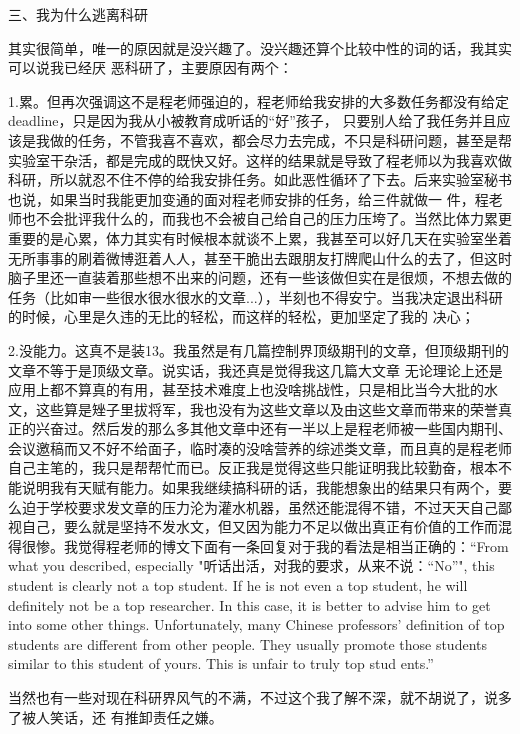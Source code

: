 \documentclass{article}
\begin{document}
三、我为什么逃离科研 

其实很简单，唯一的原因就是没兴趣了。没兴趣还算个比较中性的词的话，我其实可以说我已经厌
恶科研了，主要原因有两个： 

1.累。但再次强调这不是程老师强迫的，程老师给我安排的大多数任务都没有给定deadline，只是因为我从小被教育成听话的“好”孩子，
\newpage
只要别人给了我任务并且应该是我做的任务，不管我喜不喜欢，都会尽力去完成，不只是科研问题，甚至是帮实验室干杂活，都是完成的既快又好。这样的结果就是导致了程老师以为我喜欢做科研，所以就忍不住不停的给我安排任务。如此恶性循环了下去。后来实验室秘书也说，如果当时我能更加变通的面对程老师安排的任务，给三件就做一 件，程老师也不会批评我什么的，而我也不会被自己给自己的压力压垮了。当然比体力累更重要的是心累，体力其实有时候根本就谈不上累，我甚至可以好几天在实验室坐着无所事事的刷着微博逛着人人，甚至干脆出去跟朋友打牌爬山什么的去了，但这时脑子里还一直装着那些想不出来的问题，还有一些该做但实在是很烦，不想去做的任务（比如审一些很水很水很水的文章...），半刻也不得安宁。当我决定退出科研的时候，心里是久违的无比的轻松，而这样的轻松，更加坚定了我的
决心； 

2.没能力。这真不是装13。我虽然是有几篇控制界顶级期刊的文章，但顶级期刊的文章不等于是顶级文章。说实话，我还真是觉得我这几篇大文章
\newpage
无论理论上还是应用上都不算真的有用，甚至技术难度上也没啥挑战性，只是相比当今大批的水文，这些算是矬子里拔将军，我也没有为这些文章以及由这些文章而带来的荣誉真正的兴奋过。然后发的那么多其他文章中还有一半以上是程老师被一些国内期刊、会议邀稿而又不好不给面子，临时凑的没啥营养的综述类文章，而且真的是程老师自己主笔的，我只是帮帮忙而已。反正我是觉得这些只能证明我比较勤奋，根本不能说明我有天赋有能力。如果我继续搞科研的话，我能想象出的结果只有两个，要么迫于学校要求发文章的压力沦为灌水机器，虽然还能混得不错，不过天天自己鄙视自己，要么就是坚持不发水文，但又因为能力不足以做出真正有价值的工作而混得很惨。我觉得程老师的博文下面有一条回复对于我的看法是相当正确的：“From what you described, especially "听话出活，对我的要求，从来不说：“No”", this student is clearly not a top student. If he is not even a top student, he will definitely 
\newpage
not be a top researcher. In this case, it is better to advise him to get into some other things. Unfortunately, many Chinese professors' definition of top students are different from other people. They usually promote those students similar to this student of yours. This is unfair to truly top stud
ents.” 

当然也有一些对现在科研界风气的不满，不过这个我了解不深，就不胡说了，说多了被人笑话，还
有推卸责任之嫌。 
\end{document}
